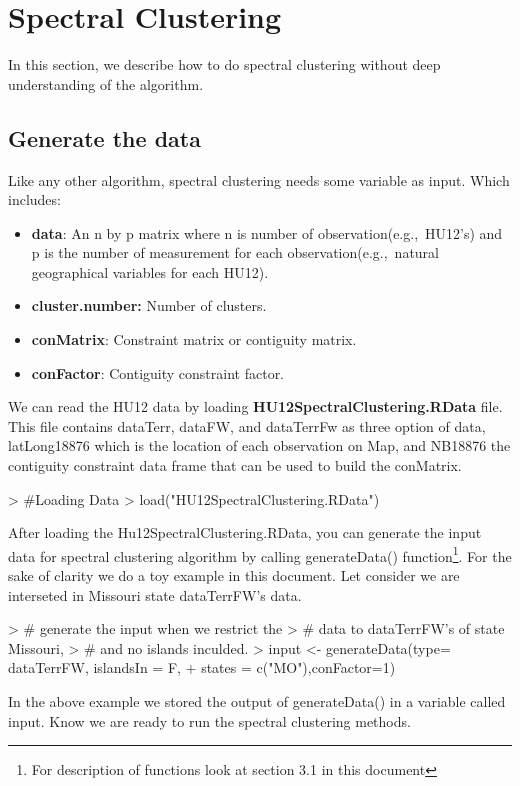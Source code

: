 \documentclass{article}
\begin{document}
\section {Spectral Clustering }
In this section, we describe how to do spectral clustering without deep understanding of the algorithm.

\subsection {Generate the data}
Like any other algorithm, spectral clustering needs some variable as input. Which includes:\\ 
\begin{itemize}
\item {\bf data}: An n by p matrix where n is number of observation(e.g.,\ HU12's) and p is the number of measurement for each observation(e.g.,\ natural geographical variables for each HU12).
\item {\bf cluster.number:} Number of clusters.
\item{\bf conMatrix}: Constraint matrix or contiguity matrix. 
\item{\bf conFactor}: Contiguity constraint factor.
\end{itemize}
We can read the HU12 data by loading {\bf HU12SpectralClustering.RData} file. This file contains dataTerr, dataFW, and dataTerrFw as three option of data, latLong18876 which is the location of each observation on Map, and NB18876 the contiguity constraint data frame that can be used to build the conMatrix.

\begin{Schunk}
\begin{Sinput}
> #Loading Data
> load("HU12SpectralClustering.RData")
\end{Sinput}
\end{Schunk}
After loading the Hu12SpectralClustering.RData, you can generate the input data for spectral clustering algorithm by calling generateData() function\footnote{For description of functions look at section 3.1 in this document}. For the sake of clarity we do a toy example in this document. Let consider we are interseted in Missouri state dataTerrFW's data.

\begin{Schunk}
\begin{Sinput}
> # generate the input when we restrict the
> # data to dataTerrFW's of state Missouri, 
> # and no islands inculded.
> input <- generateData(type= dataTerrFW, islandsIn = F,
+                     states = c("MO"),conFactor=1)
\end{Sinput}
\end{Schunk}
In the above example we stored the output of generateData() in a variable called input.
Know we are ready to run the spectral clustering methods.
\end{document}
